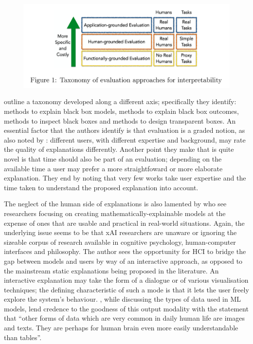 \begin{figure}[htbp]
\centerline{\includegraphics[width=\columnwidth]{literature-review/images/xai-taxonomy}}
\caption{\cite{doshi2017towards}}
\label{fig:xai-taxonomy}
\end{figure}

\cite{guidotti2018survey} outline a taxonomy developed along a different axis; specifically they identify: methods to explain black box models, methods to explain black box outcomes, methods to inspect black boxes and methods to design transparent boxes.
An essential factor that the authors identify is that evaluation is a graded notion, as also noted by \cite{gilpin2018explaining}: different users, with different expertise and background, may rate the quality of explanations differently.
Another point they make that is quite novel is that time should also be part of an evaluation; depending on the available time a user may prefer a more straightfoward or more elaborate explanation.
They end by noting that very few works take user expertise and the time taken to understand the proposed explanation into account.

The neglect of the human side of explanations is also lamented by \cite{abdul2018trends} who see researchers focusing on creating mathematically-explainable models at the expense of ones that are usable and practical in real-world situations.
Again, the underlying issue seems to be that xAI researchers are unaware or ignoring the sizeable corpus of research available in cognitive psychology, human-computer interfaces and philosophy.
The author sees the opportunity for HCI to bridge the gap between models and users by way of an interactive approach, as opposed to the mainstream static explanations being proposed in the literature.
An interactive explanation may take the form of a dialogue or of various visualisation techniques; the defining characteristic of such a mode is that it lets the user freely explore the system's behaviour.
\cite{guidotti2018survey}, while discussing the types of data used in ML models, lend credence to the goodness of this output modality with the statement that \enquote{other forms of data which are very common in daily human life are images and texts. They are perhaps for human brain even more easily understandable than tables}.

